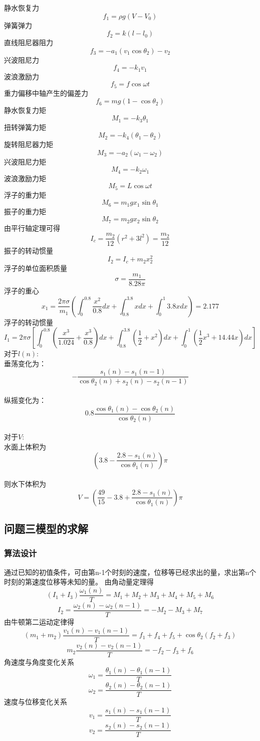 \documentclass[a4paper,12pt]{article}
\newcommand{\upcite}[1]{\textsuperscript{\textsuperscript{\cite{#1}}}}
\begin{document}
	静水恢复力
	$$f_1=\rho g(V-V_0)$$
	弹簧弹力
	$$f_2=k(l-l_0)$$
	直线阻尼器阻力
	$$f_3=-a_1(v_1\cos\theta_2)-v_2$$
	兴波阻尼力
	$$f_4=-k_1v_1$$
	波浪激励力
	$$f_5=f\cos\omega t$$
	重力偏移中轴产生的偏差力
	$$f_6=mg(1-\cos\theta_2)$$
	静水恢复力矩
	$$M_1=-k_3\theta_1$$
	扭转弹簧力矩
	$$M_2=-k_4(\theta_1-\theta_2)$$
	旋转阻尼器力矩
	$$M_3=-a_2(\omega_1-\omega_2)$$
	兴波阻尼力矩
	$$M_4=-k_2\omega_1$$
	波浪激励力矩
	$$M_5=L\cos\omega t$$
	浮子的重力矩
	$$M_6=m_1gx_1\sin\theta_1$$
	振子的重力矩
	$$M_7=m_2gx_2\sin\theta_2$$
	由平行轴定理可得
	$$I_c=\frac{m_2}{12}(r^2+3l^2)=\frac{m_2}{12}$$
	振子的转动惯量
	$$I_2=I_c+m_2x_2^2$$
	浮子的单位面积质量
	$$\sigma=\frac{m_1}{8.28\pi}$$
	浮子的重心
	$$x_1=\frac{2\pi\sigma}{m_1}(\int_{0}^{0.8}\frac{x^2}{0.8}dx+\int_{0.8}^{3.8}xdx+\int_{0}^{1}3.8xdx)=2.177$$
	浮子的转动惯量\upcite{ref2}
	$$I_1=2\pi\sigma[\int_{0}^{0.8}(\frac{x^3}{1.024}+\frac{x^3}{0.8})dx+\int_{0.8}^{3.8}(\frac{1}{2}+x^2)dx+\int_{0}^{1}(\frac{1}{2}x^3+14.44x)dx]$$
	对于$l(n)$:\\
	垂荡变化为：$$-\frac{s_1(n)-s_1(n-1)}{\cos\theta_2(n)+s_2(n)-s_2(n-1)}$$\\
	纵摇变化为：$$0.8\frac{\cos\theta_1(n)-\cos\theta_2(n)}{\cos\theta_2(n)}$$\\
	对于$V$:\\
	水面上体积为$$(3.8-\frac{2.8-s_1(n)}{\cos\theta_1(n)})\pi$$\\
	则水下体积为$$V=(\frac{49}{15}-3.8+\frac{2.8-s_1(n)}{\cos\theta_1(n)})\pi$$
	
	\subsection{问题三模型的求解}
	\subsubsection{算法设计}
	通过已知的初值条件，可由第n-1个时刻的速度，位移等已经求出的量，求出第n个时刻的第速度位移等未知的量。
	由角动量定理得
	$$(I_1+I_3)\frac{\omega_1(n)}{T}=M_1+M_2+M_3+M_4+M_5+M_6$$
	$$I_2=\frac{\omega_2(n)-\omega_2(n-1)}{T}=-M_2-M_3+M_7$$
	由牛顿第二运动定律得
	$$(m_1+m_2)\frac{v_1(n)-v_1(n-1)}{T}=f_1+f_4+f_5+\cos\theta _2(f_2+f_3)$$
	$$m_2\frac{v_2(n)-v_2(n-1)}{T}=-f_2-f_3+f_6$$
	角速度与角度变化关系
	$$\omega_1=\frac{\theta _1(n)-\theta_1(n-1)}{T}$$
	$$\omega_2=\frac{\theta _2(n)-\theta_2(n-1)}{T}$$
	速度与位移变化关系
	$$v_1=\frac{s_1(n)-s_1(n-1)}{T}$$
	$$v_2=\frac{s_2(n)-s_2(n-1)}{T}$$
\end{document}
